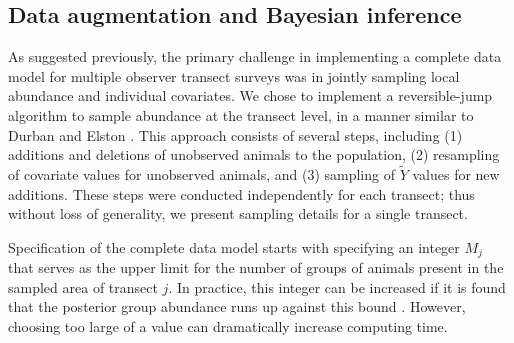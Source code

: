\documentclass[10pt]{article}
\begin{document}
\subsection*{Data augmentation and Bayesian inference}

As suggested previously, the primary challenge in implementing a complete data model for multiple observer transect surveys was in jointly sampling local abundance and individual covariates.  We chose to implement a reversible-jump algorithm to sample abundance at the transect level, in a manner similar to Durban and Elston \cite{DurbanElston2005}.  This approach consists of several steps, including (1) additions and deletions of unobserved animals to the population, (2) resampling of covariate values for unobserved animals, and (3) sampling of $\tilde{Y}$ values for new additions. These steps were conducted independently for each transect; thus without loss of generality, we present sampling details for a single transect.

Specification of the complete data model starts with specifying an integer $M_j$ that serves as the upper limit for the number of groups of animals present in the sampled area of transect $j$. In practice, this integer can be increased if it is found that the posterior group abundance runs up against this bound \cite{DurbanElston2005,RoyleEtAl2007b}. However, choosing too large of a value can dramatically increase computing time.
\end{document}
